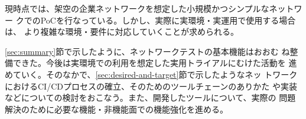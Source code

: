 現時点では、架空の企業ネットワークを想定した小規模かつシンプルなネットワー
クでのPoCを行なっている。しかし、実際に実環境・実運用で使用する場合は、
より複雑な環境・要件に対応していくことが求められる。

\ref{sec:summary}節で示したように、ネットワークテストの基本機能はおおむ
ね整備できた。今後は実環境での利用を想定した実用トライアルにむけた活動を
進めていく。そのなかで、\ref{sec:desired-and-target}節で示したようなネッ
トワークにおけるCI/CDプロセスの確立、そのためのツールチェーンのありかた
や実装などについての検討をおこなう。また、開発したツールについて、実際の
問題解決のために必要な機能・非機能面での機能強化を進める。



